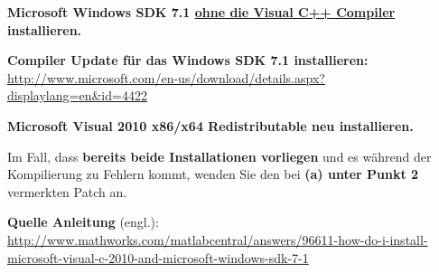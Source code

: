 \documentclass[a4paper,11pt]{article}
\begin{document}
\begin{stepbystep}
\begin{stepbystep}
\begin{stepbystep}
			\item \textbf{Microsoft Windows SDK 7.1 \uline{ohne die Visual C++ Compiler} installieren.}
			
			\item \textbf{Compiler Update für das Windows SDK 7.1 installieren: } 
			\\ \url{http://www.microsoft.com/en-us/download/details.aspx?displaylang=en&id=4422}
			
			\item \textbf{Microsoft Visual 2010 x86/x64 Redistributable neu installieren.}
			\\
		\end{stepbystep}
		
		\item Im Fall, dass \textbf{bereits beide Installationen vorliegen} und es während der Kompilierung
		zu Fehlern kommt, wenden Sie den bei \textbf{(a) unter Punkt 2} vermerkten Patch an.
		
	\end{stepbystep}
\end{stepbystep}

\textbf{Quelle Anleitung} (engl.): \url{http://www.mathworks.com/matlabcentral/answers/96611-how-do-i-install-microsoft-visual-c-2010-and-microsoft-windows-sdk-7-1}
\end{document}
